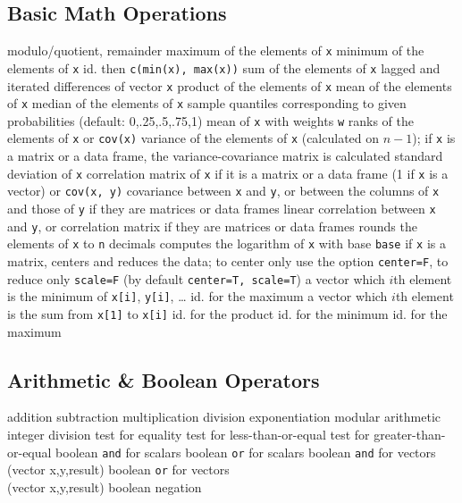 \subsection{Basic Math Operations}{}
\cmdS{\%\%, \%/\%}	{modulo/quotient, remainder}
	{ maximum of the elements of {\tt x}}
	{ minimum of the elements of {\tt x}}
	{ id. then {\tt c(min(x), max(x))}}
	{ sum of the elements of {\tt x}}
	{ lagged and iterated differences of vector {\tt x}}
	{ product of the elements of {\tt x}}
	{ mean of the elements of {\tt x}}
	{ median of the elements of {\tt x}}
	{sample quantiles corresponding to given
    probabilities (default: 0,.25,.5,.75,1)}
	{mean of {\tt x} with weights {\tt w}}
	{ ranks of the elements of {\tt x}}
	{or {\tt cov(x)}  variance of the elements of {\tt x}
    (calculated on $n-1$); if {\tt x} is a matrix or a data frame, the
    variance-covariance matrix is calculated}
	{standard deviation of {\tt x}}
	{correlation matrix of {\tt x} if it is a matrix or a data frame (1 if {\tt x} is a vector)}
	{or {\tt cov(x, y)}  covariance between {\tt x} and {\tt y}, or between the columns of {\tt x} and those of {\tt y} if they are matrices or data frames}
	{linear correlation between {\tt x} and {\tt y}, or correlation matrix if they are matrices or data frames}
	{rounds the elements of {\tt x} to {\tt n} decimals}
	{computes the logarithm of {\tt x} with base {\tt base}}
	{if {\tt x} is a matrix, centers and reduces the data; to
center only use the option {\tt center=F}, to reduce only {\tt scale=F}
(by default {\tt center=T, scale=T})}
	{ a vector which $i$th element is the minimum of {\tt x[i]}, {\tt y[i]}, \ldots}
	{ id. for the maximum}
	{a vector which $i$th element is the sum from {\tt x[1]} to {\tt x[i]}}
	{ id. for the product}
	{ id. for the minimum}
	{ id. for the maximum}

\subsection{Arithmetic \& Boolean Operators}{}
	{addition}
	{subtraction}
	{multiplication}
	{division}
	{exponentiation}
	{modular arithmetic}
	{integer division}
	{test for equality}
	{test for less-than-or-equal}
	{test for greater-than-or-equal}
	{boolean {\tt and} for scalars}
	{boolean {\tt or} for scalars}
	{boolean {\tt and} for vectors (vector x,y,result)}
	{boolean {\tt or} for vectors\\(vector x,y,result)}
	{boolean negation}

